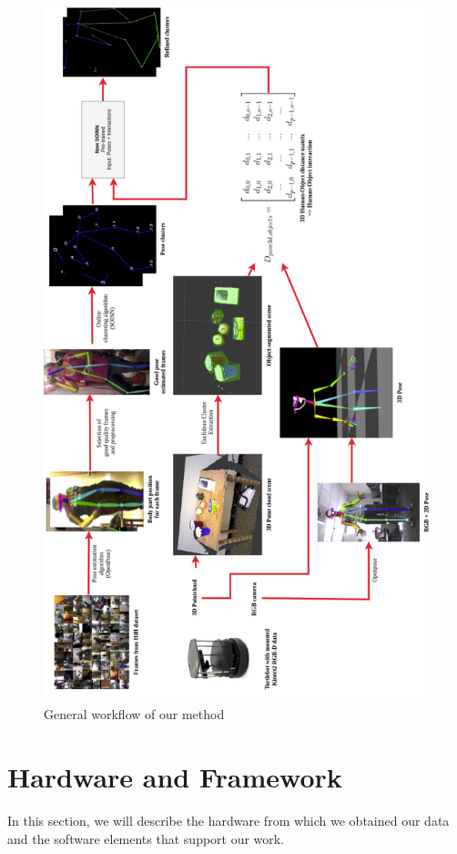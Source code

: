 \begin{figure}[htp]
\centering
\includegraphics[width=125mm, keepaspectratio]{images/workflow.png}
\caption{General workflow of our method}
\label{fig:workflow}
\end{figure}

\section{Hardware and Framework}
In this section, we will describe the hardware from which we obtained our data and the software elements that support our work.
